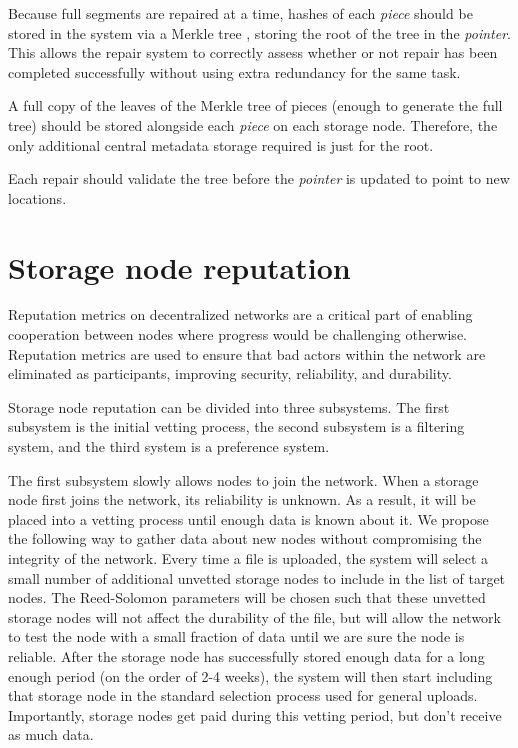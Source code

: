 \documentclass[11pt,fleqn,openany]{book}
\begin{document}
Because full segments are repaired at a time, hashes of
each {\em piece} should be stored in the system via a Merkle tree
\cite{merkle-tree}, storing the root of the tree in the {\em pointer}. This allows
the repair system to correctly assess whether or not repair has been completed
successfully without using extra redundancy for the same task.

A full copy of the leaves of the Merkle tree of pieces (enough to generate
the full tree) should be stored alongside each {\em piece} on each storage node.
Therefore, the only additional central metadata storage required is just for
the root.

Each repair should validate the tree before the {\em pointer} is updated to
point to new locations.

\section{Storage node reputation}\label{sec:concrete-reputation}

Reputation metrics on decentralized networks are a critical part of
enabling cooperation
between nodes
where progress would be challenging otherwise. Reputation metrics
are used to ensure that bad actors
within the network are eliminated as participants, improving security,
reliability, and durability.

Storage node reputation can be divided into three subsystems. The first
subsystem is the initial vetting process, the second subsystem is a filtering
system, and the third system is a preference system.

The first subsystem slowly allows nodes to join the network.
When a storage node first joins the network, its reliability is unknown.
As a result, it will be placed into a vetting
process until enough data is known about it.
We propose the following way to gather data about new nodes
without compromising the integrity of the network.
Every time a file is uploaded, the system will select a small number of
additional unvetted storage nodes to include in the list of target nodes.
The Reed-Solomon parameters will be chosen such that these unvetted storage
nodes will not affect the durability of the file, but will allow the network
to test the node
with a small fraction of data until we are sure the node is reliable.
After the storage node has successfully stored enough data for a long enough
period (on the order of 2-4 weeks),
the system will then start including that storage
node in the standard selection process used for general uploads.
Importantly, storage nodes get paid during this
vetting period, but don't receive as much data.
\end{document}
